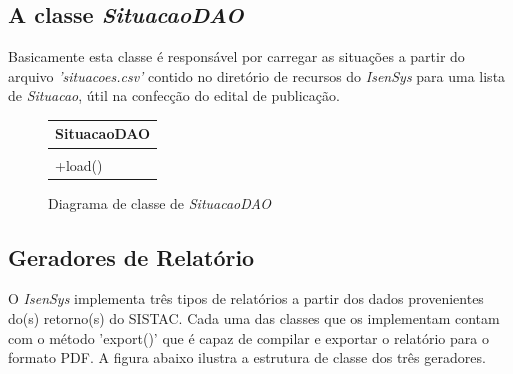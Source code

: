 \documentclass[
	12pt,			%
	openright,		%
	oneside,	
	a4paper,		%
	english,		%
	brazil			%
]{abntex2/abntex2}  %
\begin{document}
	\subsection{A classe \textit{SituacaoDAO}}
	
	Basicamente esta classe é responsável por carregar as situações a partir do arquivo \textit{'situacoes.csv'} contido no diretório de recursos do \textit{IsenSys} para uma lista de \textit{Situacao}, útil na confecção do edital de publicação.
	
	\begin{figure}[H]
		\begin{center}
			
			\caption{Diagrama de classe de \textit{SituacaoDAO}}
			\label{situacaodao-uml}
			
			\begin{tabular}{|l|}
				\hline
				\multicolumn{1}{|c|}{\textbf{SituacaoDAO}} \\ \hline
				                                           \\ \hline
				+load()                                    \\ \hline
			\end{tabular}
			
			
		\end{center}
	\end{figure}
	
	\subsection{Geradores de Relatório}
	
	O \textit{IsenSys} implementa três tipos de relatórios a partir dos dados provenientes do(s) retorno(s) do SISTAC. Cada uma das classes que os implementam contam com o método 'export()' que é capaz de compilar e exportar o relatório para o formato PDF. A figura abaixo ilustra a estrutura de classe dos três geradores.
	
\end{document}

